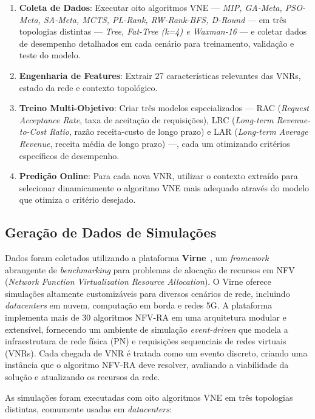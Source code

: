 \documentclass[conference]{IEEEtran}
\begin{document}
\begin{enumerate}
    \item \textbf{Coleta de Dados}: Executar oito algoritmos VNE --- \textit{MIP, GA-Meta, PSO-Meta, SA-Meta, MCTS, PL-Rank, RW-Rank-BFS, D-Round} --- em três topologias distintas --- \textit{Tree, Fat-Tree (k=4) e Waxman-16} --- e coletar dados de desempenho detalhados em cada cenário para treinamento, validação e teste do modelo.
    \item \textbf{Engenharia de Features}: Extrair 27 características relevantes das VNRs, estado da rede e contexto topológico.
    \item \textbf{Treino Multi-Objetivo}: Criar três modelos especializados --- RAC (\textit{Request Acceptance Rate}, taxa de aceitação de requisições), LRC (\textit{Long-term Revenue-to-Cost Ratio}, razão receita-custo de longo prazo) e LAR (\textit{Long-term Average Revenue}, receita média de longo prazo) ---, cada um otimizando critérios específicos de desempenho.
    \item \textbf{Predição Online}: Para cada nova VNR, utilizar o contexto extraído para selecionar dinamicamente o algoritmo VNE mais adequado através do modelo que otimiza o critério desejado.
\end{enumerate}

\subsection{Geração de Dados de Simulações}

Dados foram coletados utilizando a plataforma \textbf{Virne}~\cite{wang2024virne}, um \textit{framework} abrangente de \textit{benchmarking} para problemas de alocação de recursos em NFV (\textit{Network Function Virtualization Resource Allocation}). O Virne oferece simulações altamente customizáveis para diversos cenários de rede, incluindo \textit{datacenters} em nuvem, computação em borda e redes 5G. A plataforma implementa mais de 30 algoritmos NFV-RA em uma arquitetura modular e extensível, fornecendo um ambiente de simulação \textit{event-driven} que modela a infraestrutura de rede física (PN) e requisições sequenciais de redes virtuais (VNRs). Cada chegada de VNR é tratada como um evento discreto, criando uma instância que o algoritmo NFV-RA deve resolver, avaliando a viabilidade da solução e atualizando os recursos da rede.

As simulações foram executadas com oito algoritmos VNE em três topologias distintas, comumente usadas em \textit{datacenters}:
\end{document}
